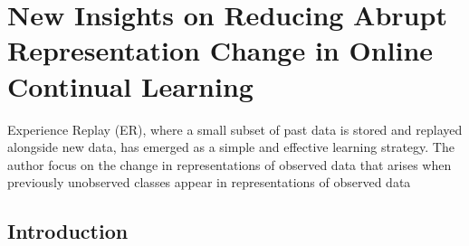 \chapter{New Insights on Reducing Abrupt Representation Change in Online Continual Learning}

Experience Replay (ER), where a small subset of past data is stored and replayed alongside new data, has emerged as a simple and effective learning strategy. The author focus on the change in representations of observed data that arises when previously unobserved classes appear in representations of observed data

\section{Introduction}